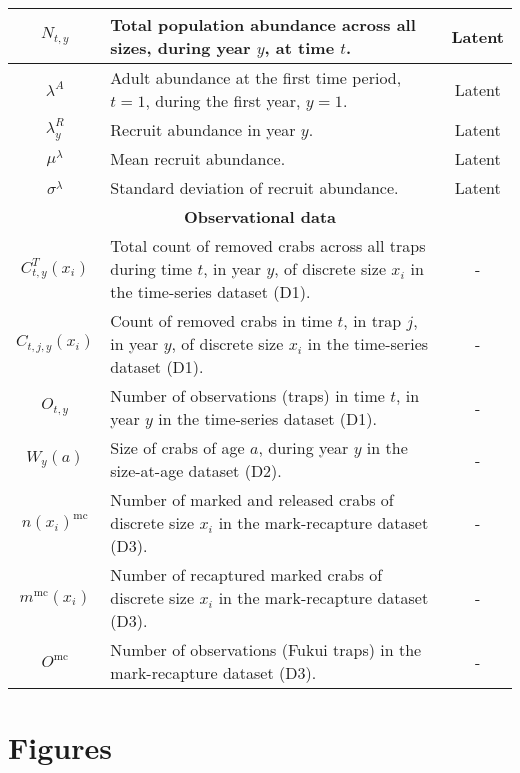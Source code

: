\documentclass{article}
\begin{document}
\begin{longtable}{||c p{9cm} c||}
 \hline
 $N_{t,y}$ & Total population abundance across all sizes, during year $y$, at time $t$. & Latent \\
 \hline
 $\lambda^A$ & Adult abundance at the first time period, $t=1$, during the first year, $y=1$. & Latent \\
 \hline
 $\lambda^R_y$ & Recruit abundance in year $y$. & Latent \\
 \hline
 $\mu^{\lambda}$ & Mean recruit abundance. & Latent \\
 \hline
 $\sigma^{\lambda}$ & Standard deviation of recruit abundance. & Latent \\
 \hline\hline
 \multicolumn{3}{||c||}{\textbf{Observational data}} \\ 
 \hline
 $C^T_{t,y}(x_i)$ & Total count of removed crabs across all traps during time $t$, in year $y$, of discrete size $x_i$ in the time-series dataset (D1). & - \\ 
 \hline
 $C_{t,j,y}(x_i)$ & Count of removed crabs in time $t$, in trap $j$, in year $y$, of discrete size $x_i$ in the time-series dataset (D1). & - \\
 \hline
 $O_{t,y}$ & Number of observations (traps) in time $t$, in year $y$ in the time-series dataset (D1). & - \\
 \hline
 $W_{y}(a)$ & Size of crabs of age $a$, during year $y$ in the size-at-age dataset (D2). & - \\
 \hline
 $n(x_i)^{\text{mc}}$ & Number of marked and released crabs of discrete size $x_i$ in the mark-recapture dataset (D3). & - \\
 \hline
 $m^{\text{mc}}(x_i)$ & Number of recaptured marked crabs of discrete size $x_i$ in the mark-recapture dataset (D3). & - \\
 \hline
 $O^{\text{mc}}$ & Number of observations (Fukui traps) in the mark-recapture dataset (D3). & - \\
 \hline
\end{longtable}

\section{Figures}
\end{document}
